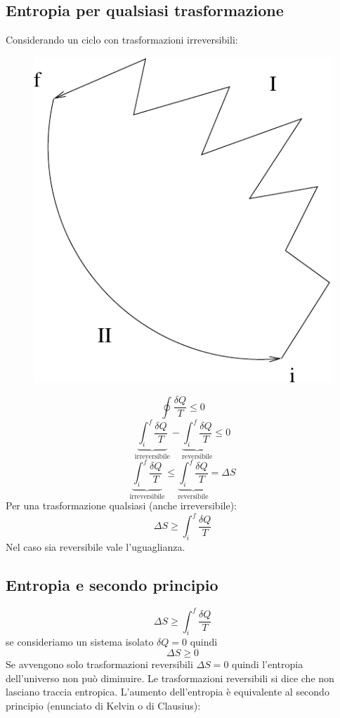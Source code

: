 \subsection{Entropia per qualsiasi trasformazione}
Considerando un ciclo con trasformazioni irreversibili:
\begin{figure}[!htbp]
\centering
\includegraphics[scale=0.5]{immagini/fisica1/ciclo_misto}
\end{figure}

$$\oint\frac{\delta Q}{T}\leq 0$$
$$\underbrace{\int_i^f\frac{\delta Q}{T}}_\text{irreversibile}-\underbrace{\int_i^f\frac{\delta Q}{T}}_\text{reversibile}\leq 0$$
$$\underbrace{\int_i^f\frac{\delta Q}{T}}_\text{irreversibile}\leq\underbrace{\int_i^f\frac{\delta Q}{T}}_\text{reversibile}=\Delta S$$
Per una trasformazione qualsiasi (anche irreversibile):
$$\Delta S\geq\int_i^f\frac{\delta Q}{T}$$
Nel caso sia reversibile vale l'uguaglianza.

\subsection{Entropia e secondo principio}
$$\Delta S\geq\int_i^f\frac{\delta Q}{T}$$
se consideriamo un sistema isolato $\delta Q=0$ quindi
$$\Delta S\geq 0$$
Se avvengono solo trasformazioni reversibili $\Delta S=0$ quindi l'entropia dell'universo non può diminuire. Le trasformazioni reversibili si dice che non lasciano traccia entropica. L'aumento dell'entropia è equivalente al secondo principio (enunciato di Kelvin o di Clausius):

